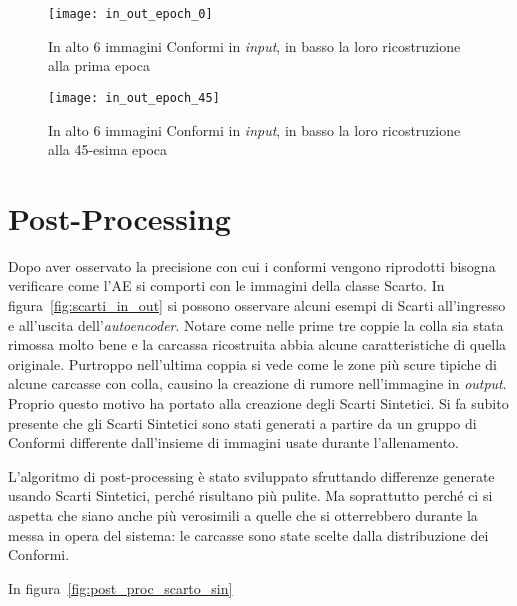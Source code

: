 \begin{figure}[ht] %
  \begin{center}
    \texttt{[image: in\_out\_epoch\_0]}
    \caption{In alto 6 immagini Conformi in \textit{input}, in basso la loro ricostruzione alla prima epoca}
    \label{fig:epoch_0}
  \end{center}
\end{figure}

\begin{figure}[ht] %
  \begin{center}
    \texttt{[image: in\_out\_epoch\_45]}
    \caption{In alto 6 immagini Conformi in \textit{input}, in basso la loro ricostruzione alla 45-esima epoca}
    \label{fig:epoch_45}
  \end{center}
\end{figure}


\clearpage
\section{Post-Processing}
Dopo aver osservato la precisione con cui i conformi vengono riprodotti bisogna verificare come l'AE si comporti con le immagini della classe Scarto.
In figura~\ref{fig:scarti_in_out} si possono osservare alcuni esempi di Scarti all'ingresso e all'uscita dell'\textit{autoencoder}.
Notare come nelle prime tre coppie la colla sia stata rimossa molto bene e la carcassa ricostruita abbia alcune caratteristiche di quella originale.
Purtroppo nell'ultima coppia si vede come le zone più scure tipiche di alcune carcasse con colla, causino la creazione di rumore nell'immagine in \textit{output}.
Proprio questo motivo ha portato alla creazione degli Scarti Sintetici.
Si fa subito presente che gli Scarti Sintetici sono stati generati a partire da un gruppo di Conformi differente dall'insieme di immagini usate durante l'allenamento.

L'algoritmo di post-processing è stato sviluppato sfruttando differenze generate usando Scarti Sintetici, perché risultano più pulite.
Ma soprattutto perché ci si aspetta che siano anche più verosimili a quelle che si otterrebbero durante la messa in opera del sistema: le carcasse sono state scelte dalla distribuzione dei Conformi. 

In figura~\ref{fig:post_proc_scarto_sin} 







